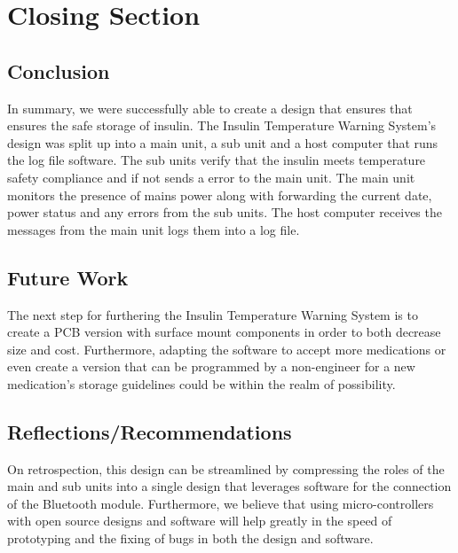 \section{Closing Section}
\subsection{Conclusion}
In summary, we were successfully able to create a design that ensures that ensures the safe storage of insulin. The Insulin Temperature Warning System's design was split up into a main unit, a sub unit and a host computer that runs the log file software. The sub units verify that the insulin meets temperature safety compliance and if not sends a error to the main unit. The main unit monitors the presence of mains power along with forwarding the current date, power status and any errors from the sub units. The host computer receives the messages from the main unit logs them into a log file.
\subsection{Future Work}
The next step for furthering the Insulin Temperature Warning System is to create a PCB version with surface mount components in order to both decrease size and cost. Furthermore, adapting the software to accept more medications or even create a version that can be programmed by a non-engineer for a new medication's storage guidelines could be within the realm of possibility.
\subsection{Reflections/Recommendations}
On retrospection, this design can be streamlined by compressing the roles of the main and sub units into a single design that leverages software for the connection of the Bluetooth module. Furthermore, we believe that using micro-controllers with open source designs and software will help greatly in the speed of prototyping and the fixing of bugs in both the design and software.

